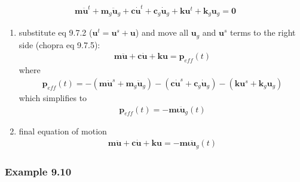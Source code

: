 \documentclass[letterpaper,10pt,english]{sphinxmanual}
\let\sphinxpxdimen\pdfpxdimen\else\newdimen\sphinxpxdimen
\begin{document}
\begin{equation*}
\begin{split}\mathbf{m}\mathbf{\ddot{u}}^t + \mathbf{m}_g\mathbf{\ddot{u}}_g
+
\mathbf{c}\mathbf{\dot{u}}^t + \mathbf{c}_g\mathbf{\dot{u}}_g
+
\mathbf{k}\mathbf{u}^t + \mathbf{k}_g\mathbf{u}_g
=
\mathbf{0}\end{split}
\end{equation*}\begin{enumerate}
%
\setcounter{enumi}{2}
\item {} 
\sphinxAtStartPar
substitute eq 9.7.2 (\(\mathbf{u}^t=\mathbf{u}^s+\mathbf{u}\)) and move all \(\mathbf{u}_g\) and \(\mathbf{u}^s\) terms to the right side (chopra eq 9.7.5):
\begin{equation*}
\begin{split}\mathbf{m}\mathbf{\ddot{u}} + \mathbf{c}\mathbf{\dot{u}} + \mathbf{k}\mathbf{u}
= \mathbf{p}_{eff}(t)\end{split}
\end{equation*}
\sphinxAtStartPar
where
\begin{equation*}
\begin{split}\mathbf{p}_{eff}(t) =
-(\mathbf{m}\mathbf{\ddot{u}}^s+\mathbf{m}_g\mathbf{\ddot{u}}_g)
-(\mathbf{c}\mathbf{\dot{u}}^s+\mathbf{c}_g\mathbf{\dot{u}}_g)
-(\mathbf{k}\mathbf{u}^s+\mathbf{k}_g\mathbf{u}_g)\end{split}
\end{equation*}
\sphinxAtStartPar
which simplifies to
\begin{equation*}
\begin{split}\mathbf{p}_{eff}(t) =
-\mathbf{m}\mathbf{\iota}\mathbf{\ddot{u}}_g(t)\end{split}
\end{equation*}
\item {} 
\sphinxAtStartPar
final equation of motion
\begin{equation*}
\begin{split}\mathbf{m}\mathbf{\ddot{u}} + \mathbf{c}\mathbf{\dot{u}} + \mathbf{k}\mathbf{u}
= -\mathbf{m}\mathbf{\iota}\mathbf{\ddot{u}}_g(t)\end{split}
\end{equation*}
\end{enumerate}


\subsubsection{Example 9.10}
\label{\detokenize{examples/05_MIMO_Event:Example-9.10}}
\sphinxAtStartPar
\sphinxincludegraphics[width=1058\sphinxpxdimen,height=1240\sphinxpxdimen]{{ex9.10}.png}
\end{document}
